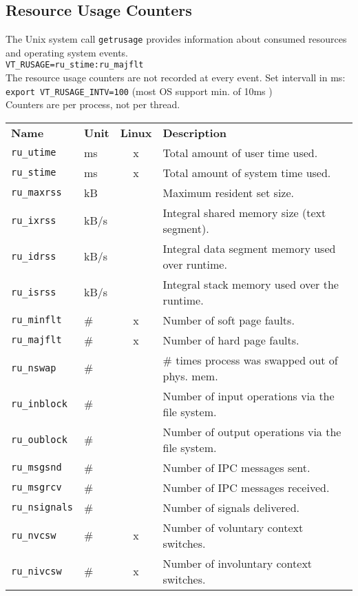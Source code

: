 \begin{multicols}{3}
\section{Resource Usage Counters}
The Unix system call \texttt{getrusage} provides information about consumed  resources and operating system events.\\
\verb|VT_RUSAGE=ru_stime:ru_majflt|\\
The resource usage counters are not recorded at every event. Set intervall in ms:\\
\texttt{export VT\_RUSAGE\_INTV=100} (most OS support min. of 10ms )\\
Counters are per process, not per thread.
\begin{tabular}{@{}l@{}l@{ }c@{ }l@{}}
\textbf{Name}          &  \textbf{Unit}  & \textbf{Linux} & \textbf{Description}  \\
\texttt{ru\_utime}     &  ms             & x         & Total amount of user time used.  \\
\texttt{ru\_stime}     &  ms             & x         & Total amount of system time used.  \\
\texttt{ru\_maxrss}    &  kB             &           & Maximum resident set size. \\
\texttt{ru\_ixrss}     &  kB/s           &           & Integral shared memory size (text segment). \\
\texttt{ru\_idrss}     &  kB/s           &           & Integral data segment memory used over runtime. \\
\texttt{ru\_isrss}     &  kB/s           &           & Integral stack memory used over the runtime. \\
\texttt{ru\_minflt}    &  \#             & x         & Number of soft page faults. \\
\texttt{ru\_majflt}    &  \#             & x         & Number of hard page faults. \\
\texttt{ru\_nswap}     &  \#             &           & \# times process was swapped out of phys. mem. \\
\texttt{ru\_inblock}   &  \#             &           & Number of input operations via the file system. \\
\texttt{ru\_oublock}   &  \#             &           & Number of output operations via the file system. \\
\texttt{ru\_msgsnd}    &  \#             &           & Number of IPC messages sent. \\
\texttt{ru\_msgrcv}    &  \#             &           & Number of IPC messages received. \\
\texttt{ru\_nsignals}  &  \#             &           & Number of signals delivered. \\
\texttt{ru\_nvcsw}     &  \#             & x         & Number of voluntary context switches. \\
\texttt{ru\_nivcsw}    &  \#             & x         & Number of involuntary context switches. \\
\end{tabular}


\end{multicols}
